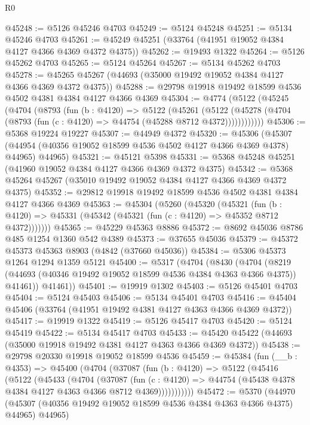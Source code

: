 \begin{lexlean}{R0}
\begin{coremodule}
@45248 := @5126 @45246 @4703
@45249 := @5124 @45248
@45251 := @5134 @45246 @4703
@45261 := @45249 @45251 (@33764 (@41951 @19052 @4384 @4127 @4366 @4369 @4372 @4375))
@45262 := @19493 @1322
@45264 := @5126 @45262 @4703
@45265 := @5124 @45264
@45267 := @5134 @45262 @4703
@45278 := @45265 @45267 (@44693 (@35000 @19492 @19052 @4384 @4127 @4366 @4369 @4372 @4375))
@45288 := @29798 @19918 @19492 @18599 @4536 @4502 @4381 @4384 @4127 @4366 @4369
@45304 := @4774
    (@5122
      (@45245
        (@4704
          (@8793
            (fun (b : @4120) =>
            @5122
              (@45261
                (@5122
                  (@45278 (@4704 (@8793 (fun (c : @4120) => @44754 (@45288 @8712 @4372))))))))))))
@45306 := @5368 @19224 @19227
@45307 := @44949 @4372
@45320 := @45306
    (@45307 (@44954 (@40356 @19052 @18599 @4536 @4502 @4127 @4366 @4369 @4378) @44965) @44965)
@45321 := @45121 @5398
@45331 := @5368 @45248 @45251 (@41960 @19052 @4384 @4127 @4366 @4369 @4372 @4375)
@45342 := @5368 @45264 @45267 (@35010 @19492 @19052 @4384 @4127 @4366 @4369 @4372 @4375)
@45352 := @29812 @19918 @19492 @18599 @4536 @4502 @4381 @4384 @4127 @4366 @4369
@45363 := @45304
    (@5260
      (@45320
        (@45321
          (fun (b : @4120) => @45331 (@45342 (@45321 (fun (c : @4120) => @45352 @8712 @4372)))))))
@45365 := @45229 @45363 @8886
@45372 := @8692 @45036 @8786 @485 @1254 @1360 @542 @4389
@45373 := @37655 @45036
@45379 := @45372 @45373 @45363 @8903 (@4842 (@37660 @45036))
@45384 := @5306 @45373 @1264 @1294 @1359 @5121
@45400 := @5317
    (@4704
      (@8430
        (@4704 (@8219 (@44693 (@40346 @19492 @19052 @18599 @4536 @4384 @4363 @4366 @4375)) @41461))
        @41461))
@45401 := @19919 @1302
@45403 := @5126 @45401 @4703
@45404 := @5124 @45403
@45406 := @5134 @45401 @4703
@45416 := @45404 @45406 (@33764 (@41951 @19492 @4381 @4127 @4363 @4366 @4369 @4372))
@45417 := @19919 @1322
@45419 := @5126 @45417 @4703
@45420 := @5124 @45419
@45422 := @5134 @45417 @4703
@45433 := @45420 @45422 (@44693 (@35000 @19918 @19492 @4381 @4127 @4363 @4366 @4369 @4372))
@45438 := @29798 @20330 @19918 @19052 @18599 @4536
@45459 := @45384
    (fun (__b : @4353) =>
    @45400
      (@4704
        (@37087
          (fun (b : @4120) =>
          @5122
            (@45416
              (@5122
                (@45433
                  (@4704
                    (@37087
                      (fun (c : @4120) =>
                      @44754 (@45438 @4378 @4384 @4127 @4363 @4366 @8712 @4369)))))))))))
@45472 := @5370
    (@44970 (@45307 (@40356 @19492 @19052 @18599 @4536 @4384 @4363 @4366 @4375) @44965) @44965)

\end{coremodule}
\end{lexlean}
